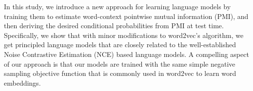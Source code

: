 In this study, we introduce a new approach for learning language models by training them to estimate word-context pointwise mutual information (PMI), and then deriving the desired conditional probabilities from PMI at test time. Specifically, we show that with minor modifications to word2vec's algorithm, we get principled language models that are closely related to the well-established Noise Contrastive Estimation (NCE) based language models. A compelling aspect of our approach is that our models are trained with the same simple negative sampling objective function that is commonly used in word2vec to learn word embeddings.
